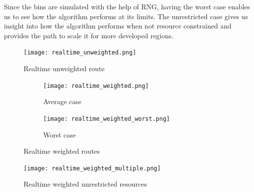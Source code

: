\documentclass[12pt]{article}
\begin{document}
Since the bins are simulated with the help of RNG, having the worst case enables us to see how the algorithm performs at its limits. The unrestricted case gives us insight into how the algorithm performs when not resource constrained and provides the path to scale it for more developed regions.
\begin{figure}[h]
    \centering
    \texttt{[image: realtime\_unweighted.png]}
    \caption{Realtime unweighted route}\label{fig5}
\end{figure}

\begin{figure}[h]
    \centering
    \begin{subfigure}{0.5\textwidth}
        \centering
        \texttt{[image: realtime\_weighted.png]}
        \caption{Average case}\label{fig6}
    \end{subfigure}%
    \begin{subfigure}{0.5\textwidth}
        \centering
        \texttt{[image: realtime\_weighted\_worst.png]}
        \caption{Worst case}\label{fig7}
    \end{subfigure}
    \caption{Realtime weighted routes}
    \label{fig:test}
\end{figure}

\begin{figure}[h]
    \centering
    \texttt{[image: realtime\_weighted\_multiple.png]}
    \caption{Realtime weighted unrestricted resources}\label{fig8}
\end{figure}
\end{document}
